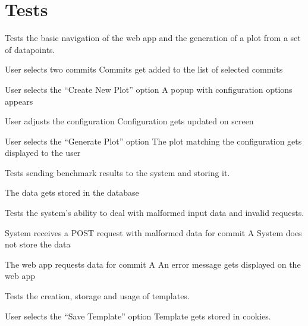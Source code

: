 \section{Tests}


Tests the basic navigation of the web app and the generation of a \gls{plot} from a set of datapoints.

{User selects two commits}
{Commits get added to the list of selected commits}

{User selects the \enquote{Create New Plot} option}
{A popup with configuration options appears}

{User adjusts the configuration}
{Configuration gets updated on screen}

{User selects the \enquote{Generate Plot} option}
{The \gls{plot} matching the configuration gets displayed to the user}


Tests sending \glspl{benchmark result} to the system and storing it.

{The data gets stored in the database}


Tests the system's ability to deal with malformed input data and invalid requests.

{System receives a POST request with malformed data for commit A}
{System does not store the data}

{The web app requests data for commit A}
{An error message gets displayed on the web app}


Tests the creation, storage and usage of \glspl{template}.

{User selects the \enquote{Save Template} option}
{Template gets stored in cookies.}

